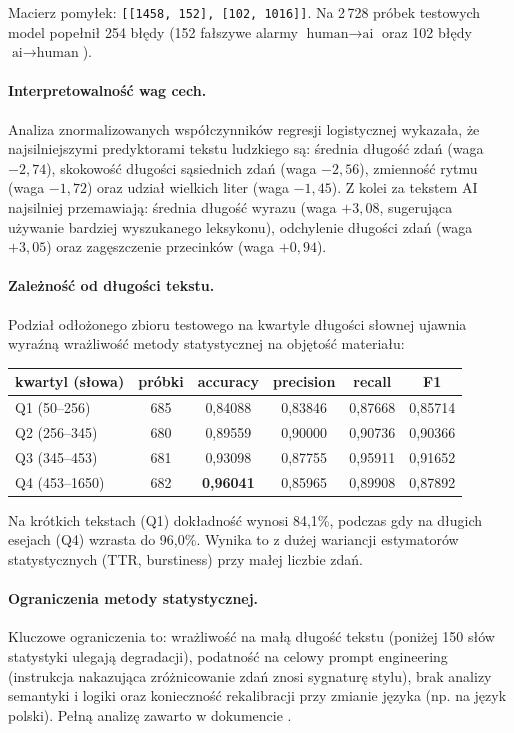 Macierz pomyłek: \texttt{[[1458, 152], [102, 1016]]}. Na 2\,728 próbek testowych
model popełnił 254 błędy (152 fałszywe alarmy $\text{human} \rightarrow \text{ai}$ oraz
102 błędy $\text{ai} \rightarrow \text{human}$).

\paragraph{Interpretowalność wag cech.}
Analiza znormalizowanych współczynników regresji logistycznej wykazała, że
najsilniejszymi predyktorami tekstu ludzkiego są: średnia długość zdań (waga $-2{,}74$),
skokowość długości sąsiednich zdań  (waga $-2{,}56$),
zmienność rytmu  (waga $-1{,}72$) oraz udział wielkich liter (waga $-1{,}45$).
Z kolei za tekstem AI najsilniej przemawiają: średnia długość wyrazu (waga $+3{,}08$,
sugerująca używanie bardziej wyszukanego leksykonu), odchylenie długości zdań (waga $+3{,}05$)
oraz zagęszczenie przecinków (waga $+0{,}94$).

\paragraph{Zależność od długości tekstu.}
Podział odłożonego zbioru testowego na kwartyle długości słownej ujawnia wyraźną
wrażliwość metody statystycznej na objętość materiału:

\begin{center}
\begin{tabular}{|l|c|c|c|c|c|}
\hline
kwartyl (słowa) & próbki & accuracy & precision & recall & F1 \\
\hline
Q1 (50--256) & 685 & 0,84088 & 0,83846 & 0,87668 & 0,85714 \\
Q2 (256--345) & 680 & 0,89559 & 0,90000 & 0,90736 & 0,90366 \\
Q3 (345--453) & 681 & 0,93098 & 0,87755 & 0,95911 & 0,91652 \\
Q4 (453--1650) & 682 & \textbf{0,96041} & 0,85965 & 0,89908 & 0,87892 \\
\hline
\end{tabular}
\end{center}

Na krótkich tekstach (Q1) dokładność wynosi 84,1\%, podczas gdy na długich esejach
(Q4) wzrasta do 96,0\%. Wynika to z dużej wariancji estymatorów statystycznych
(TTR, burstiness) przy małej liczbie zdań.

\paragraph{Ograniczenia metody statystycznej.}
Kluczowe ograniczenia to: wrażliwość na małą długość tekstu (poniżej 150 słów
statystyki ulegają degradacji), podatność na celowy prompt engineering
(instrukcja nakazująca zróżnicowanie zdań znosi sygnaturę stylu), brak analizy
semantyki i logiki oraz konieczność rekalibracji przy zmianie języka (np. na język polski).
Pełną analizę zawarto w dokumencie .

